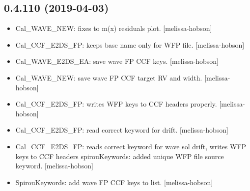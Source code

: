 \documentclass[a4paper,10pt,english]{report}
\begin{document}
\subsection{0.4.110 (2019-04-03)}
\label{\detokenize{misc/changelog:id151}}\begin{itemize}
\item {} 
Cal\_WAVE\_NEW: fixes to m(x) residuals plot. {[}melissa-hobson{]}

\item {} 
Cal\_CCF\_E2DS\_FP: keeps base name only for WFP file. {[}melissa-hobson{]}

\item {} 
Cal\_WAVE\_E2DS\_EA: save wave FP CCF keys. {[}melissa-hobson{]}

\item {} 
Cal\_WAVE\_NEW: save wave FP CCF target RV and width. {[}melissa-hobson{]}

\item {} 
Cal\_CCF\_E2DS\_FP: writes WFP keys to CCF headers properly. {[}melissa-
hobson{]}

\item {} 
Cal\_CCF\_E2DS\_FP: read correct keyword for drift. {[}melissa-hobson{]}

\item {} 
Cal\_CCF\_E2DS\_FP: reads correct keyword for wave sol drift, writes WFP
keys to CCF headers spirouKeywords: added unique WFP file source
keyword. {[}melissa-hobson{]}

\item {} 
SpirouKeywords: add wave FP CCF keys to list. {[}melissa-hobson{]}

\end{itemize}
\end{document}
